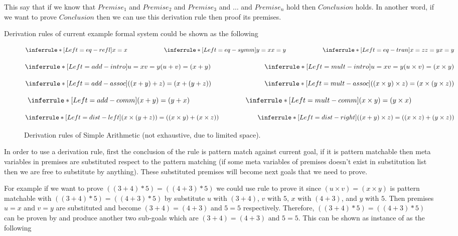 \documentclass[master.tex]{subfiles}
\begin{document}
This say that if we know that $Premise_1$ and $Premise_2$ and $Premise_3$ and
$\ldots$ and $Premise_n$ hold then $Conclusion$ holds. In another word, if
we want to prove $Conclusion$ then we can use this derivation rule then proof
its premises.

Derivation rules of current example formal system could be shown as the
following

\begin{figure}[H]
\centering
$$
\derivRule{eq-refl}{x = x}{ } \qquad  \qquad  \qquad
\derivRule{eq-symm}{x = y}{y = x} \qquad  \qquad  \qquad
\derivRule{eq-tran}{x = y}{x = z \\ z = y}
$$

$$
\derivRule{add-intro}{(u + v) = (x + y)}{u = x \\ v = y} \qquad  \qquad \qquad \qquad
\derivRule{mult-intro}{(u \times v) = (x \times y)}{u = x \\ v = y}
$$

$$
\derivRule{add-assoc}{((x + y) + z) = (x + (y + z))}{ } \qquad  \qquad  \qquad \qquad
\derivRule{mult-assoc}{((x \times y) \times z) = (x \times (y \times z))}{ }
$$

$$
\derivRule{add-comm}{(x + y) = (y + x)}{ } \qquad  \qquad  \qquad \qquad
\derivRule{mult-comm}{(x \times y) = (y \times x)}{  }
$$

$$
\derivRule{dist-left} {(x \times (y + z)) = ((x \times y) + (x
  \times z))}{ } \qquad \qquad  \qquad
\derivRule{dist-right}{((x + y) \times z) = ((x \times z) + (y
  \times z))}{ }
$$
\caption{Derivation rules of Simple Arithmetic (not exhaustive, due to limited
  space).}
\label{fig:background-derivation-rules}
\end{figure}

In order to use a derivation rule, first the conclusion of the rule is pattern
match against current goal, if it is pattern matchable then meta variables in
premises are substituted respect to the pattern matching (if some meta variables
of premises doesn't exist in substitution list then we are free to substitute by
anything). These substituted premises will become next goals that we need to prove.

For example if we want to prove $((3 + 4) * 5) = ((4 + 3) * 5)$ we could use
rule  to prove it since $(u \times v) = (x \times y)$ is
pattern matchable with $((3 + 4) * 5) = ((4 + 3) * 5)$ by substitute $u$ with $(3 +
4)$, $v$ with $5$, $x$ with $(4 + 3)$, and $y$ with $5$. Then premises $u = x$
and $v = y$ are substituted and become $(3 + 4) = (4 + 3)$ and $5 = 5$
respectively. Therefore, $((3 + 4) * 5) = ((4 + 3) * 5)$ can be proven by
 and produce another two sub-goals which are $(3 + 4) =
(4 + 3)$ and $5 = 5$. This can be shown as instance of 
as the following
\end{document}
